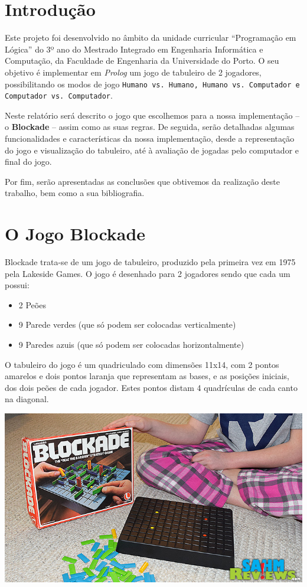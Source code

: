 \documentclass[a4paper]{article}
\begin{document}
\section{Introdução}
Este projeto foi desenvolvido no âmbito da unidade curricular “Programação em Lógica” do 3º ano do Mestrado Integrado em Engenharia Informática e Computação, da Faculdade de Engenharia da Universidade do Porto. O seu objetivo é implementar em \textit{Prolog} um jogo de tabuleiro de 2 jogadores, possibilitando os modos de jogo \texttt{Humano vs. Humano, Humano vs. Computador e Computador vs. Computador}. \par
Neste relatório será descrito o jogo que escolhemos para a nossa implementação – o \textbf{Blockade} – assim como as suas regras. De seguida, serão detalhadas algumas funcionalidades e características da nossa implementação, desde a representação do jogo e visualização do tabuleiro, até à avaliação de jogadas pelo computador e final do jogo. \par
Por fim, serão apresentadas as conclusões que obtivemos da realização deste trabalho, bem como a sua bibliografia.



\newpage
\section{O Jogo Blockade}

Blockade trata-se de um jogo de tabuleiro, produzido pela primeira vez em 1975 pela Lakeside Games.
O jogo é desenhado para 2 jogadores sendo que cada um possui: 

\begin{itemize}
\item 2 Peões
\item 9 Parede verdes (que só podem ser colocadas verticalmente)
\item 9 Paredes azuis (que só podem ser colocadas horizontalmente)
\end{itemize}

O tabuleiro do jogo é um quadriculado com dimensões 11x14, com 2 pontos amarelos e dois pontos laranja que representam as bases, e as posições iniciais, dos dois peões de cada jogador. Estes pontos distam 4 quadrículas de cada canto na diagonal. 

\begin{center}
\includegraphics[scale = 0.3]{fig1.jpg}
\end{center}
\end{document}
